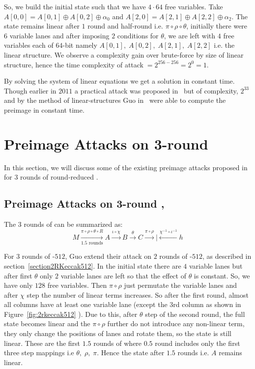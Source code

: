     So, we build the initial state such that we have $4 \cdot 64$ free variables. Take $A[0, 0] = A[0, 1] \oplus A[0, 2] \oplus \alpha_0$ and $A[2, 0] = A[2, 1] \oplus A[2, 2] \oplus \alpha_2$. The state remains linear after $1$ round and half-round i.e. $\pi \circ \rho \circ \theta$, initially there were $6$ variable lanes and after imposing $2$ conditions for $\theta$, we are left with $4$ free variables each of $64$-bit namely $A[0,1],\; A[0,2],\; A[2,1],\; A[2,2]$ i.e. the linear structure. We observe a complexity gain over brute-force by size of linear structure, hence the time complexity of attack$\;= 2^{256 - 256} = 2^{0} = 1$.
    
    By solving the system of linear equations we get a solution in constant time. Though earlier in $2011$ a practical attack was proposed in~\cite{naya2011practical} but of complexity, $2^{33}$ and by the method of linear-structures Guo \etal in~\cite{guo2016linear} were able to compute the preimage in constant time.

\section{Preimage Attacks on 3-round \KECCAK{}}

In this section, we will discuss some of the existing preimage attacks proposed in~\cite{guo2016linear} for $3$ rounds of round-reduced \KECCAK{}.

\subsection{Preimage Attacks on 3-round , }
\label{3rkeccak512attack}
The 3 rounds of \KECCAK{} can be summarized as:
   \begin{equation}\label{3r_eq}
    M \xrightarrow[\text{1.5 rounds}]{ \pi \circ \rho \circ \theta \circ R} A \xrightarrow[]{ \iota \circ \chi } B \xrightarrow[]{ \theta } C \xrightarrow[]{ \pi \circ \rho } | \xleftarrow[]{ \chi^{-1} \circ \iota^{-1} } h  
    \end{equation}

  For $3$ rounds of \KECCAK-$512$, Guo \etal extend their attack on $2$ rounds of \KECCAK-$512$, as described in section~\ref{section2RKeccak512}. In the initial state there are $4$ variable lanes but after first $\theta$ only $2$ variable lanes are left so that the effect of $\theta$ is constant. So, we have only $128$ free variables. Then $\pi \circ \rho$ just permutate the variable lanes and after $\chi$ step the number of linear terms increases. So after the first round, almost all columns have at least one variable lane (except the 3rd column as shown in Figure~\ref{fig:2rkeccak512} ). Due to this, after $\theta$ step of the second round, the full state becomes linear and the $\pi \circ \rho$ further do not introduce any non-linear term, they only change the positions of lanes and rotate them, so the state is still linear.  These are the first $1.5$ rounds of \KECCAK{} where $0.5$ round includes only the first three step mappings i.e $\theta,\; \rho,\; \pi$. Hence the state after $1.5$ rounds i.e. $A$ remains linear.
  
